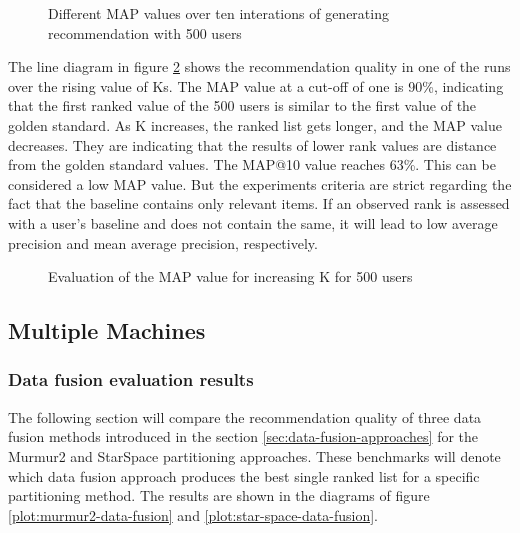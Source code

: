 \begin{figure}[h!]
    \centering
    
    \caption{Different MAP values over ten interations of generating recommendation with 500 users}
    \label{plot:single-partition-boxplot}
\end{figure}


The line diagram in figure \ref{plot:single-partition} shows the recommendation quality in one of the runs over the rising value of Ks. The MAP value at a cut-off of one is 90\%, indicating that the first ranked value of the 500 users is similar to the first value of the golden standard. As K increases, the ranked list gets longer, and the MAP value decreases. They are indicating that the results of lower rank values are distance from the golden standard values. The MAP@10 value reaches 63\%. This can be considered a low MAP value. But the experiments criteria are strict regarding the fact that the baseline contains only relevant items. If an observed rank is assessed with a user's baseline and does not contain the same, it will lead to low average precision and mean average precision, respectively.


\begin{figure}[h!]
    \centering
    
    \caption{Evaluation of the MAP value for increasing K for 500 users}
    \label{plot:single-partition}
\end{figure}

\subsection{Multiple Machines}
\label{subsec:eval-multiple-machines}

\subsubsection{Data fusion evaluation results}
\label{subsubsec:eval-data-fusion}
The following section will compare the recommendation quality of three data fusion methods introduced in the section \ref{sec:data-fusion-approaches} for the Murmur2 and StarSpace partitioning approaches. These benchmarks will denote which data fusion approach produces the best single ranked list for a specific partitioning method. The results are shown in the diagrams of figure \ref{plot:murmur2-data-fusion} and \ref{plot:star-space-data-fusion}.


